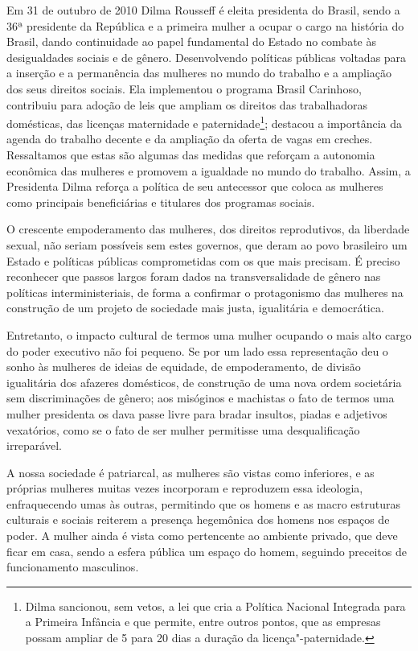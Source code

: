 Em 31 de outubro de 2010 Dilma Rousseff é eleita presidenta do Brasil,
sendo a 36ª presidente da República e a primeira mulher a ocupar o cargo
na história do Brasil, dando continuidade ao papel fundamental do
Estado no combate às desigualdades sociais e de gênero. Desenvolvendo
políticas públicas voltadas para a inserção e a permanência das mulheres
no mundo do trabalho e a ampliação dos seus direitos sociais. Ela
implementou o programa Brasil Carinhoso, contribuiu para adoção de leis
que ampliam os direitos das trabalhadoras domésticas, das licenças
maternidade e paternidade\footnote{Dilma sancionou, sem vetos, a lei que
  cria a Política Nacional Integrada para a Primeira Infância e que
  permite, entre outros pontos, que as empresas possam ampliar de 5 para
  20 dias a duração da licença"-paternidade.}; destacou a importância da
agenda do trabalho decente e da ampliação da oferta de vagas em creches.
Ressaltamos que estas são algumas das medidas que reforçam a autonomia
econômica das mulheres e promovem a igualdade no mundo do trabalho. Assim, a
Presidenta Dilma reforça a política de seu antecessor que coloca as
mulheres como principais beneficiárias e titulares dos programas
sociais.

O crescente empoderamento das mulheres, dos direitos reprodutivos, da
liberdade sexual, não seriam possíveis sem estes governos, que deram ao
povo brasileiro um Estado e políticas públicas comprometidas com os que
mais precisam. É preciso reconhecer que passos largos foram dados na
transversalidade de gênero nas políticas interministeriais, de forma a
confirmar o protagonismo das mulheres na construção de um projeto de
sociedade mais justa, igualitária e democrática.

Entretanto, o impacto cultural de termos uma mulher ocupando o mais alto
cargo do poder executivo não foi pequeno. Se por um lado essa
representação deu o sonho às mulheres de ideias de equidade, de
empoderamento, de divisão igualitária dos afazeres domésticos, de
construção de uma nova ordem societária sem discriminações de gênero;
aos misóginos e machistas o fato de termos uma mulher presidenta os dava
passe livre para bradar insultos, piadas e adjetivos vexatórios, como se
o fato de ser mulher permitisse uma desqualificação irreparável.

A nossa sociedade é patriarcal, as mulheres são vistas como
inferiores, e as próprias mulheres muitas vezes incorporam e reproduzem
essa ideologia, enfraquecendo umas às outras, permitindo que os homens e
as macro estruturas culturais e sociais reiterem a presença hegemônica
dos homens nos espaços de poder. A mulher ainda é vista como pertencente
ao ambiente privado, que deve ficar em casa, sendo a esfera pública um
espaço do homem, seguindo preceitos de funcionamento masculinos.

